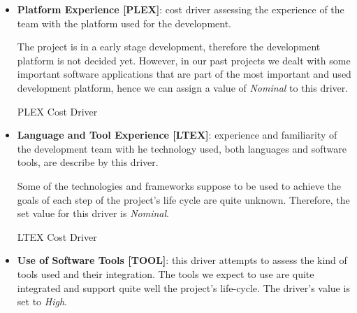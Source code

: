 \begin{itemize}
	\begin{costdriverstable}{APEX Cost Driver}
		\hline
	\end{costdriverstable}

	\item \textbf{Platform Experience [PLEX]}: cost driver assessing the experience of the team with the platform used for the development.

The project is in a early stage development, therefore the development platform is not decided yet. However, in our past projects we dealt with some important software applications that are part of the most important and used development platform, hence we can assign a value of \textit{Nominal} to this driver.

	\begin{costdriverstable}{PLEX Cost Driver}
		\hline
	\end{costdriverstable}

	\item \textbf{Language and Tool Experience [LTEX]}: experience and familiarity of the development team with he technology used, both languages and software tools, are describe by this driver.

Some of the technologies and frameworks suppose to be used to achieve the goals of each step of the project's life cycle are quite unknown. Therefore, the set value for this driver is \textit{Nominal}.

	\begin{costdriverstable}{LTEX Cost Driver}
		\hline
	\end{costdriverstable}

	\item \textbf{Use of Software Tools [TOOL]}: this driver attempts to assess the kind of tools used and their integration.
The tools we expect to use are quite integrated and support quite well the project's life-cycle. The driver's value is set to \textit{High}.


\end{itemize}
